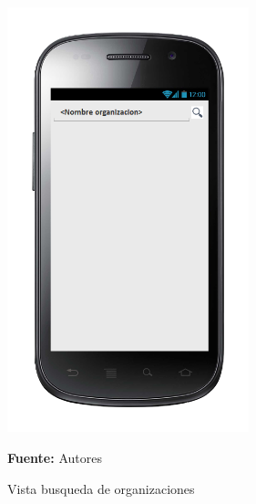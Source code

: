 \begin{figure}[!htb]
  \begin{center}
\includegraphics[width=7cm]{./imagenes/UI/Usuarios/busqueda_de_organizaciones.png}
    \caption{Vista busqueda de organizaciones}
    \label{fig:Vista_busqueda_de_organizaciones}
    \textbf{Fuente:}  Autores
  \end{center}
\end{figure}
